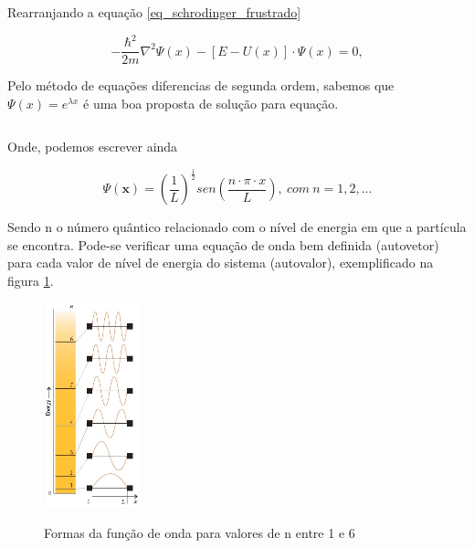     \par Rearranjando a equação \eqref{eq_schrodinger_frustrado}

    \begin{equation}\label{eq_schrodinger_frustrado}
      -\frac{\hbar^2}{2m} \nabla^2 \Psi(x) - [E - U(x)] \cdot \Psi(x) = 0,
    \end{equation}

    \par Pelo método de equações diferencias de segunda ordem, sabemos que $\Psi(x) = e^{\lambda x}$ é uma boa proposta de solução para equação.

    \begin{equation}
      \label{eq_schrodinger_frustrado_1}
    \end{equation}

   \par Onde, podemos escrever ainda

    \begin{equation}\label{eq_schrodinger_eq1}
      \Psi(\mathbf{x}) = \left(\frac{1}{L}\right)^\frac{1}{2} sen\left(\frac{n \cdot \pi \cdot x}{L}\right),\ com\ n = 1, 2, ...
    \end{equation}

    \par Sendo n o número quântico relacionado com o nível de energia em que a partícula se encontra. Pode-se verificar uma equação de onda bem definida (autovetor) para cada valor de nível de energia do sistema (autovalor), exemplificado na figura \ref{fig1}\cite{frustrado2}.

    \begin{figure}[H]
      \caption{Formas da função de onda para valores de n entre 1 e 6}
      \centering
      \includegraphics[width=0.25\textwidth]{images/figura1.png}
      \label{fig1}
    \end{figure}

